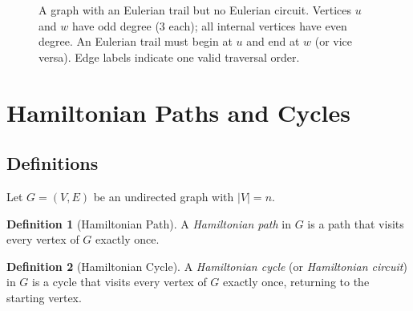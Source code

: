 \documentclass[12pt,a4paper]{article}
\theoremstyle{definition}
\newtheorem{definition}{Definition}[section]
\theoremstyle{plain}
\theoremstyle{remark}
\begin{document}
\begin{figure}[htbp]
  \centering
  \caption{A graph with an Eulerian trail but no Eulerian circuit. Vertices $u$ and $w$
           have odd degree ($3$ each); all internal vertices have even degree. An Eulerian
           trail must begin at $u$ and end at $w$ (or vice versa). Edge labels indicate
           one valid traversal order.}
  \label{fig:euler-trail}
\end{figure}

\section{Hamiltonian Paths and Cycles}
\label{sec:hamiltonian}

\subsection{Definitions}

Let $G = (V, E)$ be an undirected graph with $|V| = n$.

\begin{definition}[Hamiltonian Path]\label{def:ham-path}
A \emph{Hamiltonian path} in $G$ is a path that visits every vertex of $G$ exactly once.
\end{definition}

\begin{definition}[Hamiltonian Cycle]\label{def:ham-cycle}
A \emph{Hamiltonian cycle} (or \emph{Hamiltonian circuit}) in $G$ is a cycle that
visits every vertex of $G$ exactly once, returning to the starting vertex.
\end{definition}
\end{document}
